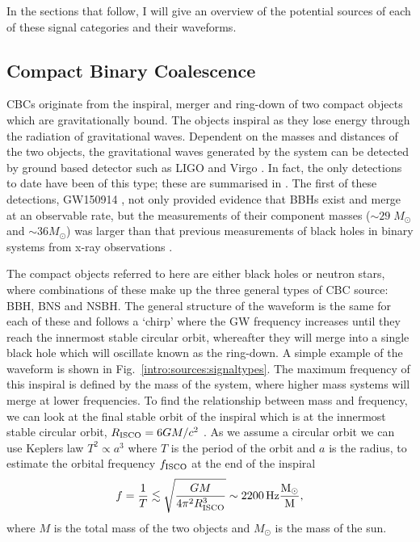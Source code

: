 In the sections that follow, I will give an overview of the potential sources
of each of these signal categories and their waveforms.


\subsection{\label{intro:sources:cbc}Compact Binary Coalescence}

\glspl{CBC} originate from the inspiral, merger and ring-down of
two compact objects which are gravitationally bound.  The objects inspiral as
they lose energy through the radiation of
gravitational waves.  Dependent on the masses and distances of the two objects,
the gravitational waves generated by the system can be detected by ground based
detector such as \gls{LIGO} \citep{aasi2015AdvancedLIGO} and Virgo
\citep{acernese2015AdvancedVirgo}.  In fact, the only detections to date have
been of this type; these are summarised in
\citep{ligoscientificcollaborationandvirgocollaboration2019GWTC1GravitationalWave}.
The first of these detections, GW150914 \citep{abbott2016ObservationGravitational}, not only provided evidence that \glspl{BBH} exist and merge at an observable rate, but the measurements of their component masses ($\sim 29\; M_{\odot}$ and $\sim 36 M_{\odot}$) was larger than that previous measurements of black holes in binary systems from x-ray observations \citep{abbott2016ASTROPHYSICALIMPLICATIONS}. 


The compact objects referred to here are either black holes or neutron
stars, where combinations of these make up the three general types of \gls{CBC} source: \gls{BBH},
\gls{BNS} and \gls{NSBH}.  The general structure of the waveform is the same
for each of these and follows a `chirp' where the \gls{GW} frequency increases until they reach the innermost stable circular orbit, whereafter they will merge into a single black hole which will oscillate known as the ring-down.  A simple example of the waveform is shown in Fig.~\ref{intro:sources:signaltypes}.  The maximum frequency of this inspiral
is defined by the mass of the system, where higher mass systems will merge at lower frequencies.
To find the relationship between mass and frequency, we can look at the final stable orbit of the inspiral which is at the innermost stable circular orbit, $R_{\rm{ISCO}} = 6GM/c^2$ \citep{maggioreGravitationalWaves}.
As we assume a circular orbit we can use Keplers law $T^2 \propto a^3$ where $T$ is the period of the orbit and $a$ is the radius, to estimate the orbital frequency $f_{\rm{ISCO}}$ at the end of the inspiral
\begin{equation}
\label{intro:sources:cbc:freq}
    f = \frac{1}{T} \lesssim \sqrt{\frac{GM}{4 \pi^2 R_{\rm{ISCO}}^3}} \sim 2200 \, \rm{Hz} \frac{M_{\odot}}{M},
\end{equation}
where $M$ is the total mass of the two objects and $M_{\odot}$ is the mass of the sun.

